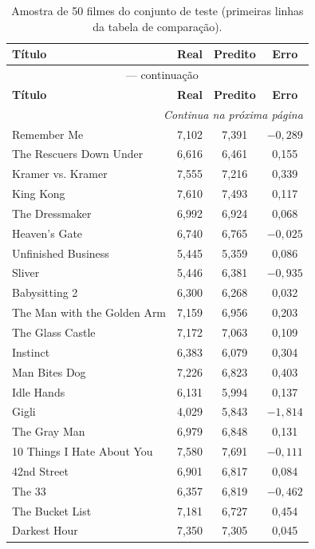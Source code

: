 \documentclass[11pt,a4paper]{article}
\begin{document}
{\footnotesize
\begin{longtable}{p{5.8cm}ccc}
  \caption{Amostra de 50 filmes do conjunto de teste (primeiras linhas da tabela de comparação).}\label{tab:head50}\\
  \toprule
  \textbf{Título} & \textbf{Real} & \textbf{Predito} & \textbf{Erro} \\
  \midrule
  \endfirsthead
  \multicolumn{4}{c}{\tablename\ \thetable{} --- continuação} \\
  \toprule
  \textbf{Título} & \textbf{Real} & \textbf{Predito} & \textbf{Erro} \\
  \midrule
  \endhead
  \midrule
  \multicolumn{4}{r}{\textit{Continua na próxima página}} \\
  \endfoot
  \bottomrule
  \endlastfoot
Remember Me & 7{,}102 & 7{,}391 & $-0{,}289$ \\
The Rescuers Down Under & 6{,}616 & 6{,}461 & 0{,}155 \\
Kramer vs. Kramer & 7{,}555 & 7{,}216 & 0{,}339 \\
King Kong & 7{,}610 & 7{,}493 & 0{,}117 \\
The Dressmaker & 6{,}992 & 6{,}924 & 0{,}068 \\
Heaven's Gate & 6{,}740 & 6{,}765 & $-0{,}025$ \\
Unfinished Business & 5{,}445 & 5{,}359 & 0{,}086 \\
Sliver & 5{,}446 & 6{,}381 & $-0{,}935$ \\
Babysitting 2 & 6{,}300 & 6{,}268 & 0{,}032 \\
The Man with the Golden Arm & 7{,}159 & 6{,}956 & 0{,}203 \\
The Glass Castle & 7{,}172 & 7{,}063 & 0{,}109 \\
Instinct & 6{,}383 & 6{,}079 & 0{,}304 \\
Man Bites Dog & 7{,}226 & 6{,}823 & 0{,}403 \\
Idle Hands & 6{,}131 & 5{,}994 & 0{,}137 \\
Gigli & 4{,}029 & 5{,}843 & $-1{,}814$ \\
The Gray Man & 6{,}979 & 6{,}848 & 0{,}131 \\
10 Things I Hate About You & 7{,}580 & 7{,}691 & $-0{,}111$ \\
42nd Street & 6{,}901 & 6{,}817 & 0{,}084 \\
The 33 & 6{,}357 & 6{,}819 & $-0{,}462$ \\
The Bucket List & 7{,}181 & 6{,}727 & 0{,}454 \\
Darkest Hour & 7{,}350 & 7{,}305 & 0{,}045 \\

\end{longtable}}
\end{document}
